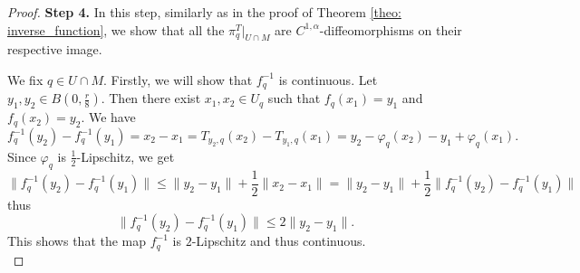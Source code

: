 \documentclass[10pt,a4paper]{amsart}
\renewcommand{\leq}{\leqslant}
\begin{document}
\begin{proof}
    \noindent \textbf{Step 4.}
    In this step, similarly as in the proof of Theorem \ref{theo: inverse_function}, we show that all the $\pi_{q}^T |_{U \cap M}$ are $C^{1,\alpha}$-diffeomorphisms on their respective image.
    
    \noindent We fix $q \in U \cap M$.
    Firstly, we will show that $f_q^{-1}$ is continuous. Let $y_1,y_2 \in B(0,\frac{r}{8})$. Then there exist $x_1,x_2 \in U_q$ such that $f_q(x_1) = y_1$ and $f_q(x_2) = y_2$.
    We have
    \[ f_q^{-1}(y_2) - f_q^{-1}(y_1) = x_2 - x_1 = T_{y_2,q}(x_2) - T_{y_1,q}(x_1) = y_2 - \varphi_q(x_2) - y_1 + \varphi_q(x_1). \]
    Since $\varphi_q$ is $\frac{1}{2}$-Lipschitz, we get
    \[ \| f_q^{-1}(y_2) - f_q^{-1}(y_1) \| \leq \| y _2 - y_1 \| + \frac{1}{2} \| x_2 - x_1\| = \| y _2 - y_1 \| + \frac{1}{2} \| f_q^{-1}(y_2) - f_q^{-1}(y_1) \| \]
    thus
    \begin{equation*} 
        \| f_q^{-1}(y_2) - f_q^{-1}(y_1) \| \leq 2 \| y _2 - y_1 \|.
    \end{equation*}
    This shows that the map $f_q^{-1}$ is $2$-Lipschitz and thus continuous. \\


\end{proof}
\end{document}
